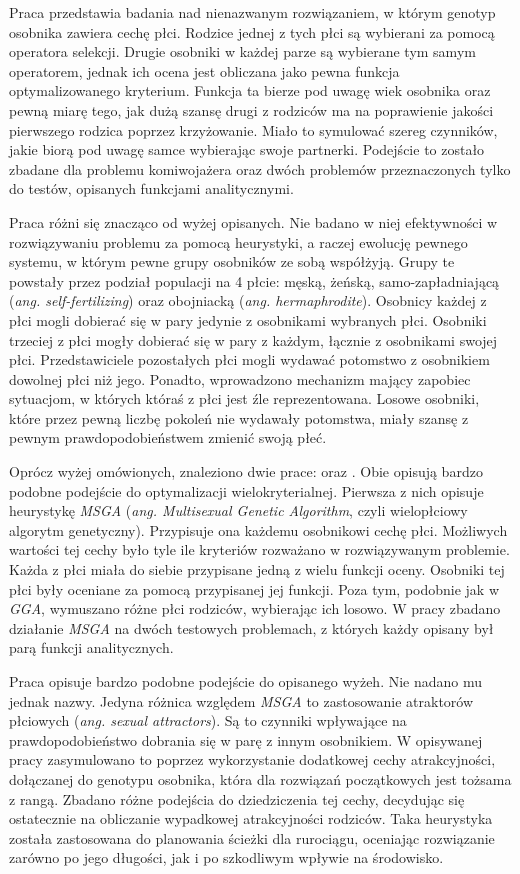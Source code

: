 \documentclass[./FM_mgr.tex]{subfiles}
\begin{document}
Praca \cite{sanchez} przedstawia badania nad nienazwanym rozwiązaniem, w którym genotyp osobnika zawiera cechę płci.
Rodzice jednej z tych płci są wybierani za pomocą operatora selekcji. 
Drugie osobniki w każdej parze są wybierane tym samym operatorem, jednak ich ocena jest obliczana jako pewna funkcja optymalizowanego kryterium.
Funkcja ta bierze pod uwagę wiek osobnika oraz pewną miarę tego, jak dużą szansę drugi z rodziców ma na poprawienie jakości pierwszego rodzica poprzez krzyżowanie.
Miało to symulować szereg czynników, jakie biorą pod uwagę samce wybierając swoje partnerki.
Podejście to zostało zbadane dla problemu komiwojażera oraz dwóch problemów przeznaczonych tylko do testów, opisanych funkcjami analitycznymi.

Praca \cite{simulating} różni się znacząco od wyżej opisanych.
Nie badano w niej efektywności w rozwiązywaniu problemu za pomocą heurystyki, a raczej ewolucję pewnego systemu, w którym pewne grupy osobników ze sobą współżyją.
Grupy te powstały przez podział populacji na 4 płcie: męską, żeńską, samo-zapładniającą (\emph{ang. self-fertilizing}) oraz obojniacką (\emph{ang. hermaphrodite}).
Osobnicy każdej z płci mogli dobierać się w pary jedynie z osobnikami wybranych płci.
Osobniki trzeciej z płci mogły dobierać się w pary z każdym, łącznie z osobnikami swojej płci.
Przedstawiciele pozostałych płci mogli wydawać potomstwo z osobnikiem dowolnej płci niż jego.
Ponadto, wprowadzono mechanizm mający zapobiec sytuacjom, w których któraś z płci jest źle reprezentowana.
Losowe osobniki, które przez pewną liczbę pokoleń nie wydawały potomstwa, miały szansę z pewnym prawdopodobieństwem zmienić swoją płeć.

Oprócz wyżej omówionych, znaleziono dwie prace: \cite{msga} oraz \cite{allenson}.
Obie opisują bardzo podobne podejście do optymalizacji wielokryterialnej.
Pierwsza z nich opisuje heurystykę \emph{MSGA} (\emph{ang. Multisexual Genetic Algorithm}, czyli wielopłciowy algorytm genetyczny).
Przypisuje ona każdemu osobnikowi cechę płci.
Możliwych wartości tej cechy było tyle ile kryteriów rozważano w rozwiązywanym problemie.
Każda z płci miała do siebie przypisane jedną z wielu funkcji oceny.
Osobniki tej płci były oceniane za pomocą przypisanej jej funkcji.
Poza tym, podobnie jak w \emph{GGA}, wymuszano różne płci rodziców, wybierając ich losowo.
W pracy \cite{msga} zbadano działanie \emph{MSGA} na dwóch testowych problemach, z których każdy opisany był parą funkcji analitycznych.

Praca \cite{allenson} opisuje bardzo podobne podejście do opisanego wyżeh.
Nie nadano mu jednak nazwy.
Jedyna różnica względem \emph{MSGA} to zastosowanie atraktorów płciowych (\emph{ang. sexual attractors}).
Są to czynniki wpływające na prawdopodobieństwo dobrania się w parę z innym osobnikiem.
W opisywanej pracy zasymulowano to poprzez wykorzystanie dodatkowej cechy atrakcyjności, dołączanej do genotypu osobnika, która dla rozwiązań początkowych jest tożsama z rangą.
Zbadano różne podejścia do dziedziczenia tej cechy, decydując się ostatecznie na obliczanie wypadkowej atrakcyjności rodziców.
Taka heurystyka została zastosowana do planowania ścieżki dla rurociągu, oceniając rozwiązanie zarówno po jego długości, jak i po szkodliwym wpływie na środowisko.
\end{document}
